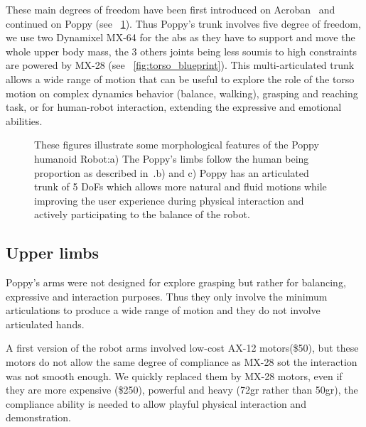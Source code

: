 These main degrees of freedom have been first introduced on Acroban~\parencite{Ly2011bio} and continued on Poppy (see \figurename~\ref{fig:poppy_torso}).
Thus Poppy's trunk involves five degree of freedom, we use two Dynamixel MX-64 for the abs as they have to support and move the whole upper body mass, the 3 others joints being less soumis to high constraints are powered by MX-28 (see \figurename~\ref{fig:torso_blueprint}). This multi-articulated trunk allows a wide range of motion that can be useful to explore the role of the torso motion on complex dynamics behavior (balance, walking), grasping and reaching task, or for human-robot interaction, extending the expressive and emotional abilities.

\begin{figure}[p]
\centering


    \hfil
    \caption{These figures illustrate some morphological features of the Poppy humanoid Robot:\newline a) The Poppy's limbs follow the human being proportion as described in~\parencite{dufour2005biomecanique}.\newline b) and c) Poppy has an articulated trunk of 5 DoFs which allows more natural and fluid motions while improving the user experience during physical interaction and actively participating to the balance of the robot.}
    \label{fig:poppy_torso}
\end{figure}



\subsection{Upper limbs} %

Poppy's arms were not designed for explore grasping but rather for balancing, expressive and interaction purposes. Thus they only involve the minimum articulations to produce a wide range of motion and they do not involve articulated hands.

A first version of the robot arms involved low-cost AX-12 motors(\$50), but these motors do not allow the same degree of compliance as MX-28 sot the interaction was not smooth enough. We quickly replaced them by MX-28 motors, even if they are more expensive (\$250), powerful and heavy (72gr rather than 50gr), the compliance ability is needed to allow playful physical interaction and demonstration.

